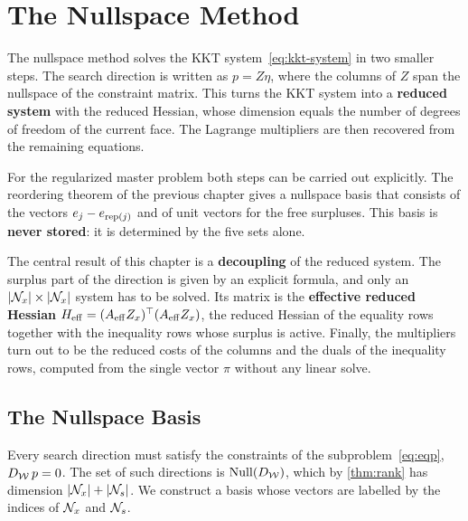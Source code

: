 \chapter{The Nullspace Method}
\label{chap:nullspace}

\vspace*{\fill}

The nullspace method solves the KKT system~\eqref{eq:kkt-system} in two smaller steps. The
search direction is written as $p = Z\eta$, where the columns of $Z$ span the nullspace of
the constraint matrix. This turns the KKT system into a \textbf{reduced system} with the
reduced Hessian, whose dimension equals the number of degrees of freedom of the current face.
The Lagrange multipliers are then recovered from the remaining equations.

\medskip

For the regularized master problem both steps can be carried out explicitly. The reordering
theorem of the previous chapter gives a nullspace basis that consists of the vectors
$e_j - e_{\operatorname{rep}(j)}$ and of unit vectors for the free surpluses. This basis is
\textbf{never stored}: it is determined by the five sets alone.

\medskip

The central result of this chapter is a \textbf{decoupling} of the reduced system. The
surplus part of the direction is given by an explicit formula, and only an
$|\mathcal{N}_x|\times|\mathcal{N}_x|$ system has to be solved. Its matrix is the \textbf{effective reduced
Hessian} $H_{\mathrm{eff}} = (A_{\mathrm{eff}} Z_x)^\top(A_{\mathrm{eff}} Z_x)$, the reduced Hessian of the equality rows
together with the inequality rows whose surplus is active. Finally, the multipliers turn out
to be the reduced costs of the columns and the duals of the inequality rows, computed from
the single vector $\pi$ without any linear solve.

\vspace*{\fill}

\newpage


\section{The Nullspace Basis}
\label{sec:basis}

Every search direction must satisfy the constraints of the subproblem~\eqref{eq:eqp},
$D_{\mathcal{W}}\,p = 0$. The set of such directions is $\operatorname{Null}(D_{\mathcal{W}})$, which by \cref{thm:rank} has
dimension $|\mathcal{N}_x|+|\mathcal{N}_s|$. We construct a basis whose vectors are labelled by the indices of
$\mathcal{N}_x$ and $\mathcal{N}_s$.

